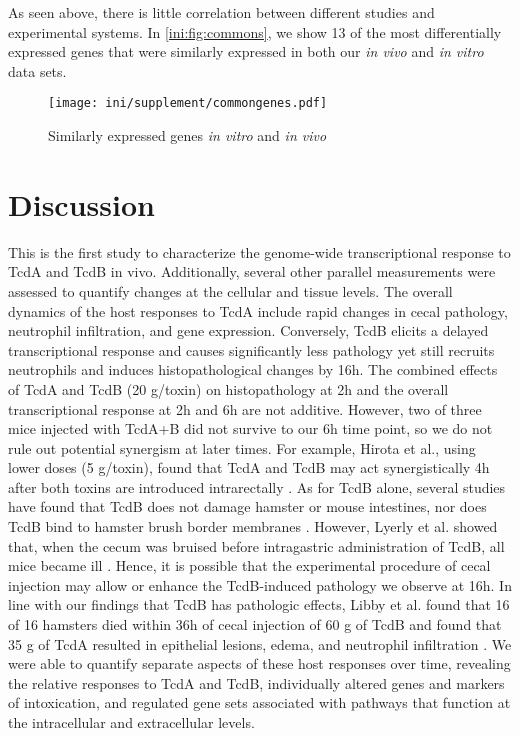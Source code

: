As seen above, there is little correlation between different studies
and experimental systems. In \autoref{ini:fig:commons}, we show
13 of the most differentially expressed genes that were similarly 
expressed in both our \emph{in vivo} and \emph{in vitro} data sets.

\begin{figure}[ht]
\centering
\texttt{[image: ini/supplement/commongenes.pdf]}
\caption{Similarly expressed genes \emph{in vitro} and \emph{in vivo}}
\label{ini:fig:commons}
\end{figure}


\section{Discussion}

This is the first study to characterize the genome-wide transcriptional 
response to TcdA and TcdB in vivo. Additionally, several other parallel 
measurements were assessed to quantify changes at the cellular and 
tissue levels. The overall dynamics of the host responses to TcdA 
include rapid changes in cecal pathology, neutrophil infiltration, 
and gene expression. Conversely, TcdB elicits a delayed 
transcriptional response and causes significantly less pathology 
yet still recruits neutrophils and induces histopathological 
changes by 16h. The combined effects of TcdA and TcdB 
(20 \textmugreek{}g/toxin) on histopathology at 2h and the overall 
transcriptional response at 2h and 6h are not additive. 
However, two of three mice injected with TcdA+B did not 
survive to our 6h time point, so we do not rule out potential 
synergism at later times. For example, Hirota et al., using 
lower doses (5 \textmugreek{}g/toxin), found that TcdA and TcdB may act 
synergistically 4h after both toxins are introduced intrarectally 
\cite{Hirota:2012gx}. As for TcdB alone, several studies have 
found that TcdB does not damage hamster or mouse intestines, nor 
does TcdB bind to hamster brush border membranes 
\cite{Lyerly:1985dx,Rolfe:1991vx}. However, Lyerly et al. 
showed that, when the cecum was bruised before intragastric 
administration of TcdB, all mice became ill \cite{Lyerly:1985dx}. 
Hence, it is possible that the experimental procedure of cecal 
injection may allow or enhance the TcdB-induced pathology we 
observe at 16h. In line with our findings that TcdB has pathologic 
effects, Libby et al. found that 16 of 16 hamsters died within 36h 
of cecal injection of 60 \textmugreek{}g of TcdB and found that 35 \textmugreek{}g of TcdA 
resulted in epithelial lesions, edema, and neutrophil 
infiltration \cite{Libby:1982wm}. We were able to quantify separate 
aspects of these host responses over time, revealing the 
relative responses to TcdA and TcdB, individually altered 
genes and markers of intoxication, and regulated gene sets 
associated with pathways that function at the intracellular 
and extracellular levels.

